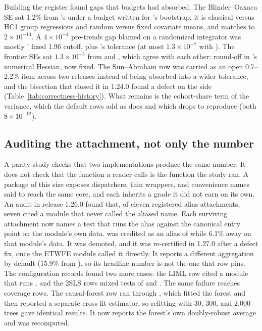 Building the register found gaps that budgets had absorbed. The
Blinder--Oaxaca SE sat 1.2\% from 's under a budget
written for 's bootstrap; it is classical versus HC1 group
regressions and random versus fixed covariate means, and
 matches to \(2\times10^{-14}\). A
\(4\times10^{-4}\) pre-trends gap blamed on a randomized integrator was
mostly ' fixed 1.96 cutoff, plus 's tolerance
(at most \(1.3\times10^{-7}\) with ). The frontier SEs sat \(1.3\times10^{-5}\) from
 and , which agree with each other: round-off
in \statspai{}'s numerical Hessian, now fixed. The Sun--Abraham row was
carried as an open 0.7--2.2\% item across two releases instead of being
absorbed into a wider tolerance, and the bisection that closed it in
1.24.0 found a defect on the \statspai{} side
(Table~\ref{tab:correctness-history}). What remains is the cohort-share
term of the \citet{sun2021estimating} variance, which the default rows add as
 does and which 
drops to reproduce  (both \(8\times10^{-12}\)).

\subsection{Auditing the attachment, not only the number}
\label{sec:attachment-audit}

A parity study checks that two implementations produce the same number. It
does not check that the function a reader calls is the function the study
ran. A package of this size exposes dispatchers, thin wrappers, and
convenience names said to reach the same core, and each inherits a grade it
did not earn on its own. An audit in release 1.26.0 found that, of eleven
registered alias attachments, seven cited a module that never called the
aliased name. Each surviving attachment now names a test that runs the alias
against the canonical entry point on the module's own data.
 was credited as an alias of  while
6.1\% away on that module's data. It was demoted, and it was re-certified
in 1.27.0 after a defect fix, once the ETWFE module called it directly. It reports
a different aggregation by default (15.9\% from ), so its
headline number is not the one that row pins. The configuration records found
two more cases: the LIML row cited a module that runs , and
the 2SLS rows mixed tests of  and . The same
failure reaches coverage rows. The causal-forest row ran through
, which fitted the forest and then reported a
separate cross-fit estimator, so refitting with 30, 300, and 2{,}000 trees
gave identical results. It now reports the forest's own doubly-robust average
and was recomputed.

